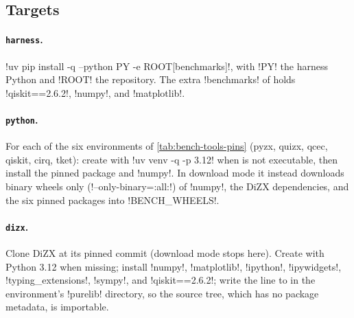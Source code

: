 {\subsection{Targets}

\paragraph{\texttt{harness}.} \code!uv pip install -q --python PY -e ROOT[benchmarks]!, with \code!PY! the harness Python and \code!ROOT! the repository. The extra \code!benchmarks! of  holds \code!qiskit==2.6.2!, \code!numpy!, and \code!matplotlib!.

\paragraph{\texttt{python}.} For each of the six environments of \cref{tab:bench-tools-pins} (pyzx, quizx, qcec, qiskit, cirq, tket): create  with \code!uv venv -q -p 3.12! when  is not executable, then install the pinned package and \code!numpy!. In download mode it instead downloads binary wheels only (\code!--only-binary=:all:!) of \code!numpy!, the DiZX dependencies, and the six pinned packages into \code!BENCH_WHEELS!.

\paragraph{\texttt{dizx}.} Clone DiZX at its pinned commit (download mode stops here). Create  with Python 3.12 when missing; install \code!numpy!, \code!matplotlib!, \code!ipython!, \code!ipywidgets!, \code!typing_extensions!, \code!sympy!, and \code!qiskit==2.6.2!; write the line  to  in the environment's \code!purelib! directory, so the source tree, which has no package metadata, is importable.

}
